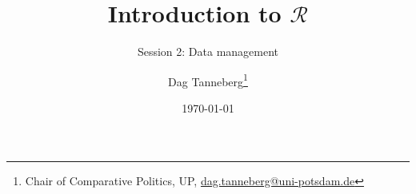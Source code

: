 \usepackage[utf8]{inputenc}
\usepackage{hyperref}
\usepackage{graphicx}
\usepackage{booktabs}

\title{Introduction to $\mathcal{R}$}
\subtitle{Session 2: Data management}
\author{Dag Tanneberg\thanks{%
  Chair of Comparative Politics, UP, %
  \href{mailto:dag.tanneberg@uni-potsdam.de}%
    {dag.tanneberg@uni-potsdam.de}
  }
}
\date{\today}
\hypersetup{colorlinks, urlcolor = red, linkcolor = }

